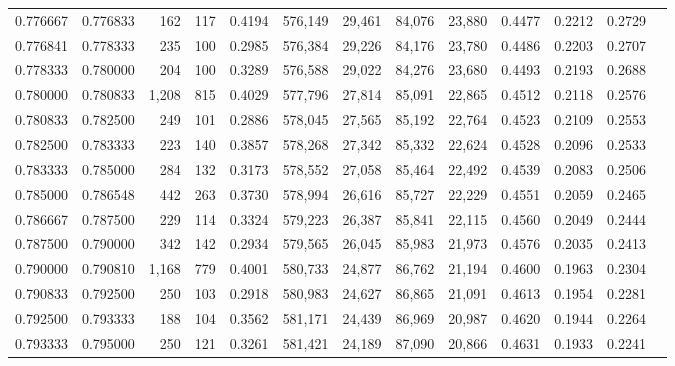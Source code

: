 \begin{tabular}{rrrrrrrrrrrrr}
0.776667 & 0.776833 &   162 & 117 &                                     0.4194 & 576,149 &  29,461 &  84,076 &  23,880 & 0.4477 & 0.2212 & 0.2729 \\
0.776841 & 0.778333 &   235 & 100 &                                     0.2985 & 576,384 &  29,226 &  84,176 &  23,780 & 0.4486 & 0.2203 & 0.2707 \\
0.778333 & 0.780000 &   204 & 100 &                                     0.3289 & 576,588 &  29,022 &  84,276 &  23,680 & 0.4493 & 0.2193 & 0.2688 \\
0.780000 & 0.780833 & 1,208 & 815 &                                     0.4029 & 577,796 &  27,814 &  85,091 &  22,865 & 0.4512 & 0.2118 & 0.2576 \\
0.780833 & 0.782500 &   249 & 101 &                                     0.2886 & 578,045 &  27,565 &  85,192 &  22,764 & 0.4523 & 0.2109 & 0.2553 \\
0.782500 & 0.783333 &   223 & 140 &                                     0.3857 & 578,268 &  27,342 &  85,332 &  22,624 & 0.4528 & 0.2096 & 0.2533 \\
0.783333 & 0.785000 &   284 & 132 &                                     0.3173 & 578,552 &  27,058 &  85,464 &  22,492 & 0.4539 & 0.2083 & 0.2506 \\
0.785000 & 0.786548 &   442 & 263 &                                     0.3730 & 578,994 &  26,616 &  85,727 &  22,229 & 0.4551 & 0.2059 & 0.2465 \\
0.786667 & 0.787500 &   229 & 114 &                                     0.3324 & 579,223 &  26,387 &  85,841 &  22,115 & 0.4560 & 0.2049 & 0.2444 \\
0.787500 & 0.790000 &   342 & 142 &                                     0.2934 & 579,565 &  26,045 &  85,983 &  21,973 & 0.4576 & 0.2035 & 0.2413 \\
0.790000 & 0.790810 & 1,168 & 779 &                                     0.4001 & 580,733 &  24,877 &  86,762 &  21,194 & 0.4600 & 0.1963 & 0.2304 \\
0.790833 & 0.792500 &   250 & 103 &                                     0.2918 & 580,983 &  24,627 &  86,865 &  21,091 & 0.4613 & 0.1954 & 0.2281 \\
0.792500 & 0.793333 &   188 & 104 &                                     0.3562 & 581,171 &  24,439 &  86,969 &  20,987 & 0.4620 & 0.1944 & 0.2264 \\
0.793333 & 0.795000 &   250 & 121 &                                     0.3261 & 581,421 &  24,189 &  87,090 &  20,866 & 0.4631 & 0.1933 & 0.2241 \\

\end{tabular}

